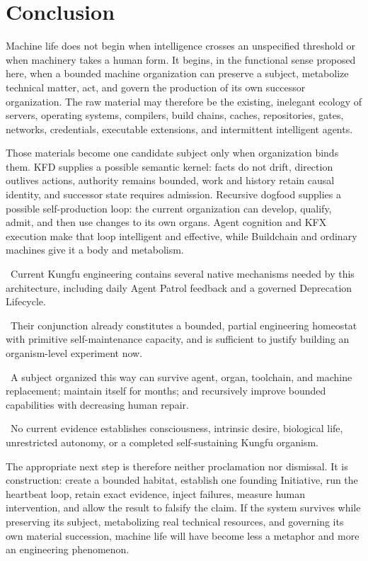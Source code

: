 \section{Conclusion}

Machine life does not begin when intelligence crosses an unspecified threshold
or when machinery takes a human form. It begins, in the functional sense
proposed here, when a bounded machine organization can preserve a subject,
metabolize technical matter, act, and govern the production of its own
successor organization. The raw material may therefore be the existing,
inelegant ecology of servers, operating systems, compilers, build chains,
caches, repositories, gates, networks, credentials, executable extensions,
and intermittent intelligent agents.

Those materials become one candidate subject only when organization binds
them. KFD supplies a possible semantic kernel: facts do not drift, direction
outlives actions, authority remains bounded, work and history retain causal
identity, and successor state requires admission. Recursive dogfood supplies
a possible self-production loop: the current organization can develop,
qualify, admit, and then use changes to its own organs. Agent cognition and KFX
execution make that loop intelligent and effective, while Buildchain and
ordinary machines give it a body and metabolism.

\factlabel\ Current Kungfu engineering contains several native mechanisms
needed by this architecture, including daily Agent Patrol feedback and a
governed Deprecation Lifecycle.

\inferencelabel\ Their conjunction already constitutes a bounded, partial
engineering homeostat with primitive self-maintenance capacity, and is
sufficient to justify building an organism-level experiment now.

\hypothesislabel\ A subject organized this way can survive agent, organ,
toolchain, and machine replacement; maintain itself for months; and recursively
improve bounded capabilities with decreasing human repair.

\nonclaimlabel\ No current evidence establishes consciousness, intrinsic
desire, biological life, unrestricted autonomy, or a completed self-sustaining
Kungfu organism.

The appropriate next step is therefore neither proclamation nor dismissal. It
is construction: create a bounded habitat, establish one founding Initiative,
run the heartbeat loop, retain exact evidence, inject failures, measure human
intervention, and allow the result to falsify the claim. If the system survives
while preserving its subject, metabolizing real technical resources, and
governing its own material succession, machine life will have become less a
metaphor and more an engineering phenomenon.
